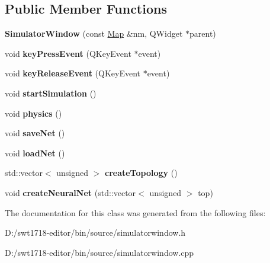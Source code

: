 \subsection*{Public Member Functions}
\begin{DoxyCompactItemize}
\item 
\mbox{\label{class_simulator_window_adb262f9a95fb635130e46f007111634c}} 
{\bfseries Simulator\+Window} (const \mbox{\hyperlink{class_map}{Map}} \&nm, Q\+Widget $\ast$parent)
\item 
\mbox{\label{class_simulator_window_a8e5b4f7ecb285477e56c1656e27a7113}} 
void {\bfseries key\+Press\+Event} (Q\+Key\+Event $\ast$event)
\item 
\mbox{\label{class_simulator_window_a3937f408fabc25c99089b98d45cf4807}} 
void {\bfseries key\+Release\+Event} (Q\+Key\+Event $\ast$event)
\item 
\mbox{\label{class_simulator_window_a7551f243a88a306b947d34afd313e905}} 
void {\bfseries start\+Simulation} ()
\item 
\mbox{\label{class_simulator_window_a98450d06554b6b88a9d9eb33244566cf}} 
void {\bfseries physics} ()
\item 
\mbox{\label{class_simulator_window_aae57e66151a2a6831f8a2d9aa39f6ea2}} 
void {\bfseries save\+Net} ()
\item 
\mbox{\label{class_simulator_window_af0e5cac29c16154c853b1bfe9bf1c46e}} 
void {\bfseries load\+Net} ()
\item 
\mbox{\label{class_simulator_window_aa239fb1f5683451a7ebaa6e2a3c76c34}} 
std\+::vector$<$ unsigned $>$ {\bfseries create\+Topology} ()
\item 
\mbox{\label{class_simulator_window_ac9dc692851c4165653f4455f4c162676}} 
void {\bfseries create\+Neural\+Net} (std\+::vector$<$ unsigned $>$ top)
\end{DoxyCompactItemize}


The documentation for this class was generated from the following files\+:\begin{DoxyCompactItemize}
\item 
D\+:/swt1718-\/editor/bin/source/simulatorwindow.\+h\item 
D\+:/swt1718-\/editor/bin/source/simulatorwindow.\+cpp\end{DoxyCompactItemize}
